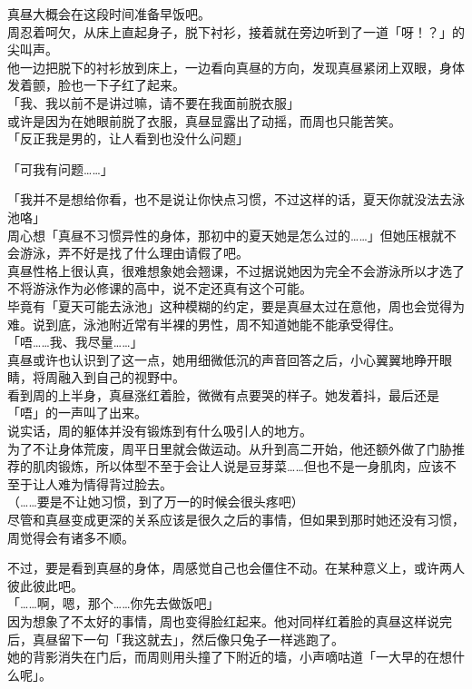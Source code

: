 真昼大概会在这段时间准备早饭吧。\\

周忍着呵欠，从床上直起身子，脱下衬衫，接着就在旁边听到了一道「呀！？」的尖叫声。\\

他一边把脱下的衬衫放到床上，一边看向真昼的方向，发现真昼紧闭上双眼，身体发着颤，脸也一下子红了起来。\\

「我、我以前不是讲过嘛，请不要在我面前脱衣服」\\

或许是因为在她眼前脱了衣服，真昼显露出了动摇，而周也只能苦笑。\\

「反正我是男的，让人看到也没什么问题」

「可我有问题……」

「我并不是想给你看，也不是说让你快点习惯，不过这样的话，夏天你就没法去泳池咯」\\

周心想「真昼不习惯异性的身体，那初中的夏天她是怎么过的……」但她压根就不会游泳，弄不好是找了什么理由请假了吧。\\

真昼性格上很认真，很难想象她会翘课，不过据说她因为完全不会游泳所以才选了不将游泳作为必修课的高中，说不定还真有这个可能。\\

毕竟有「夏天可能去泳池」这种模糊的约定，要是真昼太过在意他，周也会觉得为难。说到底，泳池附近常有半裸的男性，周不知道她能不能承受得住。\\

「唔……我、我尽量……」\\

真昼或许也认识到了这一点，她用细微低沉的声音回答之后，小心翼翼地睁开眼睛，将周融入到自己的视野中。\\

看到周的上半身，真昼涨红着脸，微微有点要哭的样子。她发着抖，最后还是「唔」的一声叫了出来。\\

说实话，周的躯体并没有锻炼到有什么吸引人的地方。\\

为了不让身体荒废，周平日里就会做运动。从升到高二开始，他还额外做了门胁推荐的肌肉锻炼，所以体型不至于会让人说是豆芽菜……但也不是一身肌肉，应该不至于让人难为情得背过脸去。\\

（……要是不让她习惯，到了万一的时候会很头疼吧）\\

尽管和真昼变成更深的关系应该是很久之后的事情，但如果到那时她还没有习惯，周觉得会有诸多不顺。

不过，要是看到真昼的身体，周感觉自己也会僵住不动。在某种意义上，或许两人彼此彼此吧。\\

「……啊，嗯，那个……你先去做饭吧」\\

因为想象了不太好的事情，周也变得脸红起来。他对同样红着脸的真昼这样说完后，真昼留下一句「我这就去」，然后像只兔子一样逃跑了。\\

她的背影消失在门后，而周则用头撞了下附近的墙，小声嘀咕道「一大早的在想什么呢」。
